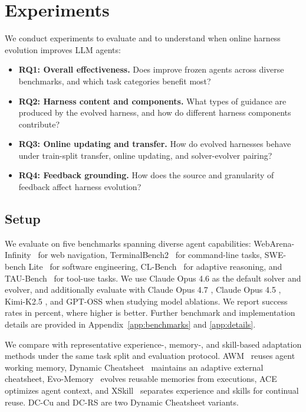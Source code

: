 \section{Experiments}\label{sec:exp}
\label{sec:experiments}

We conduct experiments to evaluate \algname{} and to understand when online harness evolution improves LLM agents:
\begin{itemize}[leftmargin=12pt,noitemsep,topsep=2pt]
    \item \textbf{RQ1: Overall effectiveness.}
    Does \algname{} improve frozen agents across diverse benchmarks, and which task categories benefit most?
    \item \textbf{RQ2: Harness content and components.}
    What types of guidance are produced by the evolved harness, and how do different harness components contribute?
    \item \textbf{RQ3: Online updating and transfer.}
    How do evolved harnesses behave under train-split transfer, online updating, and solver-evolver pairing?
    \item \textbf{RQ4: Feedback grounding.}
    How does the source and granularity of feedback affect harness evolution?
\end{itemize}

\subsection{Setup}\label{sec:exp-setup}

We evaluate \algname{} on five benchmarks spanning diverse agent capabilities: WebArena-Infinity~\citep{zhou2026wainf} for web navigation, TerminalBench2~\citep{merrill2026terminalbenchbenchmarkingagentshard} for command-line tasks, SWE-bench Lite~\citep{jimenez2024swebench} for software engineering, CL-Bench~\citep{dou2026cl} for adaptive reasoning, and TAU-Bench~\citep{yao2024tau} for tool-use tasks. We use Claude Opus 4.6 \cite{claude_opus_46} as the default solver and evolver, and additionally evaluate with Claude Opus 4.7 \cite{claude_opus_47}, Claude Opus 4.5 \cite{claude_opus_45}, Kimi-K2.5 \cite{team2026kimi}, and GPT-OSS \cite{agarwal2025gpt} when studying model ablations. We report success rates in percent, where higher is better. Further benchmark and implementation details are provided in Appendix~\ref{app:benchmarks} and \ref{app:details}.

We compare with representative experience-, memory-, and skill-based adaptation methods under the same task split and evaluation protocol. AWM~\citep{wang2024agent} reuses agent working memory, Dynamic Cheatsheet~\citep{suzgun2025dynamic} maintains an adaptive external cheatsheet, Evo-Memory~\citep{wei2025evo} evolves reusable memories from executions, ACE~\citep{zhang2025agentic} optimizes agent context, and XSkill~\citep{jiang2026xskill} separates experience and skills for continual reuse. DC-Cu and DC-RS are two Dynamic Cheatsheet variants.


